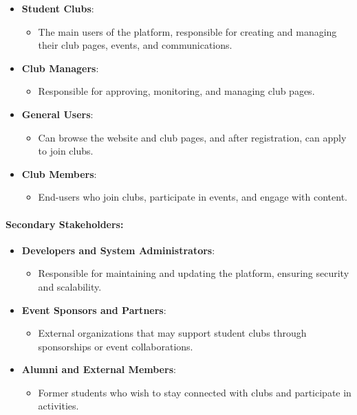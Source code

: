 \begin{itemize}
\item
  \textbf{Student Clubs}:

  \begin{itemize}
  \item
    The main users of the platform, responsible for creating and
    managing their club pages, events, and communications.
  \end{itemize}
\item
  \textbf{Club Managers}:

  \begin{itemize}
  \item
    Responsible for approving, monitoring, and managing club pages.
  \end{itemize}
\item
  \textbf{General Users}:

  \begin{itemize}
  \item
    Can browse the website and club pages, and after registration, can
    apply to join clubs.
  \end{itemize}
\item
  \textbf{Club Members}:

  \begin{itemize}
  \item
    End-users who join clubs, participate in events, and engage with
    content.
  \end{itemize}
\end{itemize}

\paragraph{Secondary Stakeholders:}\label{secondary-stakeholders}

\begin{itemize}
\item
  \textbf{Developers and System Administrators}:

  \begin{itemize}
  \item
    Responsible for maintaining and updating the platform, ensuring
    security and scalability.
  \end{itemize}
\item
  \textbf{Event Sponsors and Partners}:

  \begin{itemize}
  \item
    External organizations that may support student clubs through
    sponsorships or event collaborations.
  \end{itemize}
\item
  \textbf{Alumni and External Members}:

  \begin{itemize}
  \item
    Former students who wish to stay connected with clubs and
    participate in activities.
  \end{itemize}
\end{itemize}

